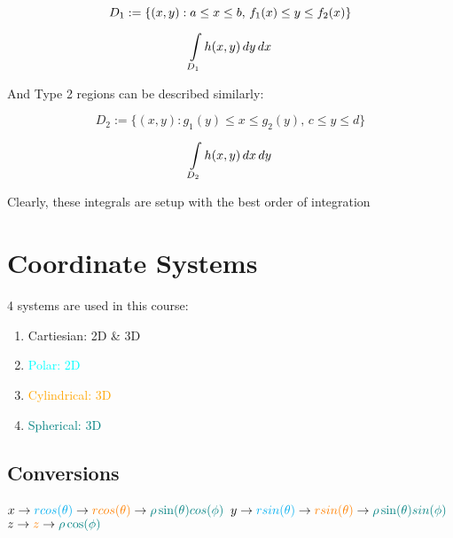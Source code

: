 \documentclass[12pt, letterpaper]{article}
\begin{document}
  \[
    D_{1} := \{(x,y) : a \leq x \leq b,\, f_{1}(x) \leq y \leq f_{2}(x)\} \\ 
  \]

  \begin{equation*}
    \int \limits_{D_{1}} h(x,y)\,dy\,dx  \\
  \end{equation*}

  And Type 2 regions can be described similarly: 
  
  \[
    D_{2} := \{(x,y) : g_{1}(y) \leq x \leq g_{2}(y),\, c \leq y \leq d \}
  \]

  \begin{equation*}
    \int \limits_{D_{2}} h(x,y)\,dx\,dy \\ 
  \end{equation*}

  Clearly, these integrals are setup with the best order of integration

\pagebreak

  \section*{Coordinate Systems}

  4 systems are used in this course:

  \begin{enumerate}
    \item Cartiesian: 2D \& 3D
    \item \textcolor{cyan}{Polar: 2D}
    \item \textcolor{orange}{Cylindrical: 3D}
    \item \textcolor{teal}{Spherical: 3D}
  \end{enumerate}

  \subsection*{Conversions}

  $x \rightarrow \textcolor{cyan}{rcos(\theta)} \rightarrow \textcolor{orange}{rcos(\theta)} \rightarrow \textcolor{teal}{\rho\sin(\theta)cos(\phi)}$ \newline
  $y \rightarrow \textcolor{cyan}{rsin(\theta)} \rightarrow \textcolor{orange}{rsin(\theta)} \rightarrow \textcolor{teal}{\rho\sin(\theta)sin(\phi)}$ \newline
  $z \rightarrow \textcolor{orange}{z} \rightarrow \textcolor{teal}{\rho\cos(\phi)}$ \newline
\end{document}
